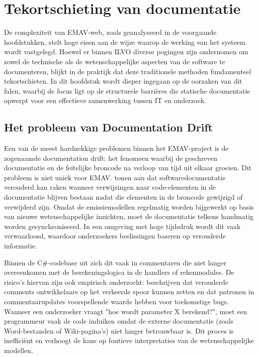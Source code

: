 \chapter{Tekortschieting van documentatie}
\label{ch:tekortschieting_documentatie}

De complexiteit van EMAV-web, zoals geanalyseerd in de voorgaande hoofdstukken, stelt hoge eisen aan de wijze waarop de werking van het systeem wordt vastgelegd. Hoewel er binnen ILVO diverse pogingen zijn ondernomen om zowel de technische als de wetenschappelijke aspecten van de software te documenteren, blijkt in de praktijk dat deze traditionele methoden fundamenteel tekortschieten. In dit hoofdstuk wordt dieper ingegaan op de oorzaken van dit falen, waarbij de focus ligt op de structurele barrières die statische documentatie opwerpt voor een effectieve samenwerking tussen IT en onderzoek.

\section{Het probleem van \textquotedbl Documentation Drift\textquotedbl}
Een van de meest hardnekkige problemen binnen het EMAV-project is de zogenaamde documentation drift: het fenomeen waarbij de geschreven documentatie en de feitelijke broncode na verloop van tijd uit elkaar groeien. Dit probleem is niet uniek voor EMAV. \textcite{tan2024outdatedDocumentation} tonen aan dat softwaredocumentatie verouderd kan raken wanneer verwijzingen naar code-elementen in de documentatie blijven bestaan nadat die elementen in de broncode gewijzigd of verwijderd zijn. Omdat de emissiemodellen regelmatig worden bijgewerkt op basis van nieuwe wetenschappelijke inzichten, moet de documentatie telkens handmatig worden gesynchroniseerd. In een omgeving met hoge tijdsdruk wordt dit vaak verwaarloosd, waardoor onderzoekers beslissingen baseren op verouderde informatie.

Binnen de C\#-codebase uit zich dit vaak in commentaren die niet langer overeenkomen met de berekeningslogica in de handlers of rekenmodules. De risico's hiervan zijn ook empirisch onderzocht: \textcite{ibrahim2012commentBugs} beschrijven dat verouderde comments ontwikkelaars op het verkeerde spoor kunnen zetten en dat patronen in commentaarupdates voorspellende waarde hebben voor toekomstige bugs. Wanneer een onderzoeker vraagt "hoe wordt parameter X berekend?", moet een programmeur vaak de code induiken omdat de externe documentatie (zoals Word-bestanden of Wiki-pagina's) niet langer betrouwbaar is. Dit proces is inefficiënt en verhoogt de kans op foutieve interpretaties van de wetenschappelijke modellen.

